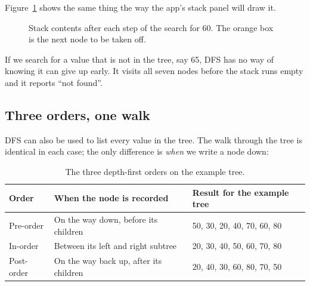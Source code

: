 \documentclass[11pt,a4paper]{article}
\begin{document}
Figure~\ref{fig:stack} shows the same thing the way the app's stack panel will draw it.

\begin{figure}[H]
\centering
{}
\caption{Stack contents after each step of the search for 60. The orange box is the next node to be taken off.}
\label{fig:stack}
\end{figure}

If we search for a value that is not in the tree, say 65, DFS has no way of knowing it can give
up early. It visits all seven nodes before the stack runs empty and it reports ``not found''.

\subsection{Three orders, one walk}

DFS can also be used to list every value in the tree. The walk through the tree is identical in
each case; the only difference is \emph{when} we write a node down:

\begin{table}[H]
\centering
\small
\begin{tabularx}{\textwidth}{@{}l L l@{}}
  \toprule
  \textbf{Order} & \textbf{When the node is recorded} & \textbf{Result for the example tree} \\
  \midrule
  Pre-order  & On the way down, before its children & 50, 30, 20, 40, 70, 60, 80 \\
  In-order   & Between its left and right subtree    & 20, 30, 40, 50, 60, 70, 80 \\
  Post-order & On the way back up, after its children & 20, 40, 30, 60, 80, 70, 50 \\
  \bottomrule
\end{tabularx}
\caption{The three depth-first orders on the example tree.}
\label{tab:orders}
\end{table}
\end{document}
